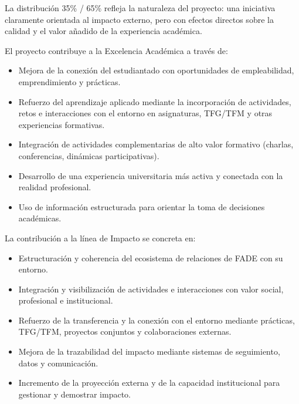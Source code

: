 \documentclass[11pt,a4paper]{scrreprt}
\begin{document}
La distribución 35\% / 65\% refleja la naturaleza del proyecto: una iniciativa claramente orientada al impacto externo, pero con efectos directos sobre la calidad y el valor añadido de la experiencia académica.



\small
El proyecto contribuye a la Excelencia Académica a través de:

\begin{itemize}[noitemsep,topsep=2pt]
\item Mejora de la conexión del estudiantado con oportunidades de empleabilidad, emprendimiento y prácticas.
\item Refuerzo del aprendizaje aplicado mediante la incorporación de actividades, retos e interacciones con el entorno en asignaturas, TFG/TFM y otras experiencias formativas.
\item Integración de actividades complementarias de alto valor formativo (charlas, conferencias, dinámicas participativas).
\item Desarrollo de una experiencia universitaria más activa y conectada con la realidad profesional.
\item Uso de información estructurada para orientar la toma de decisiones académicas.
\end{itemize}



\small
La contribución a la línea de Impacto se concreta en:

\begin{itemize}[noitemsep,topsep=2pt]
\item Estructuración y coherencia del ecosistema de relaciones de FADE con su entorno.
\item Integración y visibilización de actividades e interacciones con valor social, profesional e institucional.
\item Refuerzo de la transferencia y la conexión con el entorno mediante prácticas, TFG/TFM, proyectos conjuntos y colaboraciones externas.
\item Mejora de la trazabilidad del impacto mediante sistemas de seguimiento, datos y comunicación.
\item Incremento de la proyección externa y de la capacidad institucional para gestionar y demostrar impacto.
\end{itemize}
\end{document}
